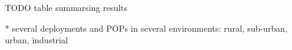 TODO table summarsing results

* several deployments and POPs in several environments: rural, sub-urban, urban, industrial
